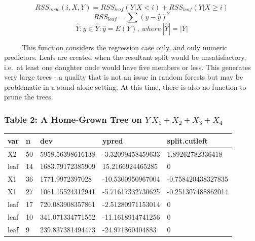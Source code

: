 \documentclass[12pt,twoside]{reedthesis}
\begin{document}
  \[RSS_{node} (i,X,Y) = RSS_{leaf}(Y|X <i) + RSS_{leaf}(Y|X \geq i) \]
  \[RSS_{leaf} = \sum (y - \hat{y})^2 \]
  \[\hat{Y}: \hat{y} \in \hat{Y}: \hat{y} = E(Y), \ where\  |\hat{Y}| = |Y|\]
  
  ~~~~~This function considers the regression case only, and only numeric
  predictors. Leafs are created when the resultant split would be
  unsatisfactory, i.e.~at least one daughter node would have five members
  or less. This generates very large trees - a quality that is not an
  issue in random forests but may be problematic in a stand-alone setting.
  At this time, there is also no function to prune the trees.
  
  \subsubsection{\texorpdfstring{Table 2: A Home-Grown Tree on
  \(Y~X_1+X_2+X_3+X_4\)}{Table 2: A Home-Grown Tree on Y\textasciitilde{}X\_1+X\_2+X\_3+X\_4}}\label{table-2-a-home-grown-tree-on-yx_1x_2x_3x_4}
  
  \begin{tabular}{l|l|l|l|l}
  \hline
  var & n & dev & ypred & split.cutleft\\
  \hline
  X2 & 50 & 5958.56398616138 & -3.32099458459633 & 1.89262782336418\\
  \hline
  leaf & 14 & 1683.79172385909 & 15.2166924465285 & 0\\
  \hline
  X1 & 36 & 1771.9972397028 & -10.5300950967004 & -0.758420438327835\\
  \hline
  X1 & 27 & 1061.15524312941 & -5.71617332730625 & -0.251307488862014\\
  \hline
  leaf & 17 & 720.083908357861 & -2.51280971153014 & 0\\
  \hline
  leaf & 10 & 341.071334771552 & -11.1618914741256 & 0\\
  \hline
  leaf & 9 & 239.837381494473 & -24.971860404883 & 0\\
  \hline
  \end{tabular}
  
\end{document}
